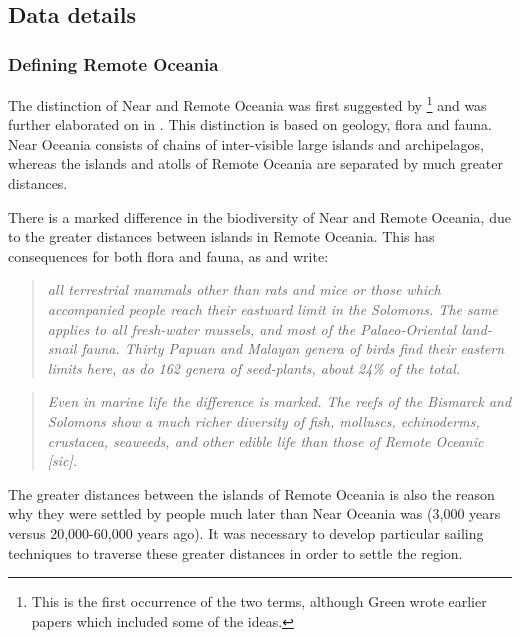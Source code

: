 \documentclass[12pt,letterpaper]{article}
\begin{document}
\subsection{Data details}

\FloatBarrier
\subsubsection{Defining Remote Oceania}
The distinction of Near and Remote Oceania was first suggested by \citet{pawley1973dating}\footnote{This is the first occurrence of the two terms, although Green wrote earlier papers which included some of the ideas.} and was further elaborated on in \citet{green1991near}. This distinction is based on geology, flora and fauna. Near Oceania consists of chains of inter-visible large islands and archipelagos, whereas the islands and atolls of Remote Oceania are separated by much greater distances. 

There is a marked difference in the biodiversity of Near and Remote Oceania, due to the greater distances between islands in Remote Oceania. This has consequences for both flora and fauna, as \citet{green1991near} and \citet{pawley2007locatingoceanic} write:

\begin{quotation}
\noindent \emph{all terrestrial mammals other than rats and mice or those which accompanied people reach their eastward limit in the Solomons. The same applies to all fresh-water mussels, and most of the Palaeo-Oriental land-snail fauna. Thirty Papuan and Malayan genera of birds find their eastern limits here, as do 162 genera of seed-plants, about 24\% of the total.}
\end{quotation}
\begin{flushright} \citet[495]{green1991near}
\end{flushright}

\begin{quotation}
\noindent \emph{Even in marine life the difference is marked. The reefs of the Bismarck and Solomons show a much richer diversity of fish, molluscs, echinoderms, crustacea, seaweeds, and other edible life than those of Remote Oceanic [sic].}
\end{quotation}
\begin{flushright}  \citet[19]{pawley2007locatingoceanic} \end{flushright}

The greater distances between the islands of Remote Oceania is also the reason why they were settled by people much later than Near Oceania was (3,000 years versus 20,000-60,000 years ago). It was necessary to develop particular sailing techniques to traverse these greater distances in order to settle the region.
\end{document}
